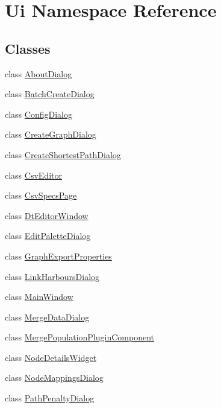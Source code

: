 \hypertarget{namespace_ui}{}\section{Ui Namespace Reference}
\label{namespace_ui}
\subsection*{Classes}
\begin{DoxyCompactItemize}
\item 
class \mbox{\hyperlink{class_ui_1_1_about_dialog}{About\+Dialog}}
\item 
class \mbox{\hyperlink{class_ui_1_1_batch_create_dialog}{Batch\+Create\+Dialog}}
\item 
class \mbox{\hyperlink{class_ui_1_1_config_dialog}{Config\+Dialog}}
\item 
class \mbox{\hyperlink{class_ui_1_1_create_graph_dialog}{Create\+Graph\+Dialog}}
\item 
class \mbox{\hyperlink{class_ui_1_1_create_shortest_path_dialog}{Create\+Shortest\+Path\+Dialog}}
\item 
class \mbox{\hyperlink{class_ui_1_1_csv_editor}{Csv\+Editor}}
\item 
class \mbox{\hyperlink{class_ui_1_1_csv_specs_page}{Csv\+Specs\+Page}}
\item 
class \mbox{\hyperlink{class_ui_1_1_dt_editor_window}{Dt\+Editor\+Window}}
\item 
class \mbox{\hyperlink{class_ui_1_1_edit_palette_dialog}{Edit\+Palette\+Dialog}}
\item 
class \mbox{\hyperlink{class_ui_1_1_graph_export_properties}{Graph\+Export\+Properties}}
\item 
class \mbox{\hyperlink{class_ui_1_1_link_harbours_dialog}{Link\+Harbours\+Dialog}}
\item 
class \mbox{\hyperlink{class_ui_1_1_main_window}{Main\+Window}}
\item 
class \mbox{\hyperlink{class_ui_1_1_merge_data_dialog}{Merge\+Data\+Dialog}}
\item 
class \mbox{\hyperlink{class_ui_1_1_merge_population_plugin_component}{Merge\+Population\+Plugin\+Component}}
\item 
class \mbox{\hyperlink{class_ui_1_1_node_details_widget}{Node\+Details\+Widget}}
\item 
class \mbox{\hyperlink{class_ui_1_1_node_mappings_dialog}{Node\+Mappings\+Dialog}}
\item 
class \mbox{\hyperlink{class_ui_1_1_path_penalty_dialog}{Path\+Penalty\+Dialog}}

\end{DoxyCompactItemize}
